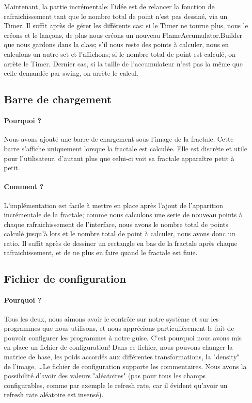 \documentclass[a4paper]{article}
\begin{document}
Maintenant, la partie incrémentale: l'idée est de relancer la fonction de rafraichissement tant que le nombre total de point n'est pas dessiné, via un Timer. Il suffit après de gérer les différents cas: si le Timer ne tourne plus, nous le créons et le lançons, de plus nous créons un nouveau FlameAccumulator.Builder que nous gardons dans la class; s'il nous reste des points à calculer, nous en calculons un autre set et l'affichons; si le nombre total de point est calculé, on arrète le Timer. Dernier cas, si la taille de l'accumulateur n'est pas la même que celle demandée par swing, on arrète le calcul.

\subsection*{Barre de chargement}
\paragraph{Pourquoi ?}
Nous avons ajouté une barre de chargement sous l'image de la fractale. Cette barre s'affiche uniquement lorsque la fractale est calculée. Elle est discrète et utile pour l'utilisateur, d'autant plus que celui-ci voit sa fractale apparaître petit à petit.

\paragraph{Comment ?}
L'implémentation est facile à mettre en place après l'ajout de l'apparition incrémentale de la fractale; comme nous calculons une serie de nouveau points à chaque rafraichissement de l'interface, nous avons le nombre total de points calculé jusqu'à lors et le nombre total de point à calculer, nous avons donc un ratio. Il suffit après de dessiner un rectangle en bas de la fractale après chaque rafraichissement, et de ne plus en faire quand le fractale est finie.

\subsection*{Fichier de configuration}
\paragraph{Pourquoi ?}
Tous les deux, nous aimons avoir le contrôle sur notre système et sur les programmes que nous utilisons, et nous apprécions particulièrement le fait de pouvoir configurer les programmes à notre guise. C'est pourquoi nous avons mis en place un fichier de configuration! Dans ce fichier, nous pouvons changer la matrice de base, les poids accordés aux différentes transformations, la "density" de l'image, \ldots Le fichier de configuration supporte les commentaires. Nous avons la possibilité d'avoir des valeurs "aléatoires" (pas pour tous les champs configurables, comme par exemple le refresh rate, car il évident qu'avoir un refresh rate aléatoire est insensé).
\end{document}
